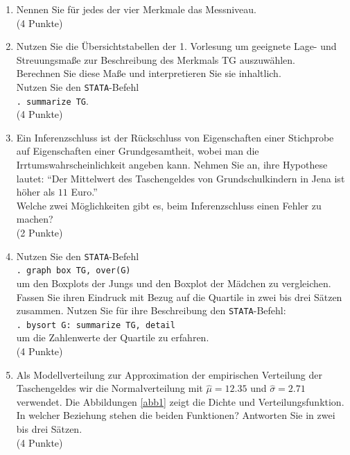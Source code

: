\documentclass[11pt]{article}
\newcommand{\punkte}[1]{{\small{ }(#1 Punkte)}}
\begin{document}
\begin{enumerate}
 \begin{enumerate}
 \item{Nennen Sie für jedes der vier Merkmale das Messniveau.}\\ \punkte{4}
 \item{Nutzen Sie die Übersichtstabellen der 1. Vorlesung um geeignete Lage- und Streuungsmaße
 zur Beschreibung des Merkmals TG auszuwählen.\\ Berechnen Sie diese Maße und interpretieren Sie sie inhaltlich.\\
 Nutzen Sie den \texttt{STATA}-Befehl \\ \texttt{. summarize TG}.}\\ \punkte{4}
 \item{ Ein Inferenzschluss ist der Rückschluss von Eigenschaften einer Stichprobe auf Eigenschaften einer Grundgesamtheit, wobei man die Irrtumswahrscheinlichkeit angeben kann. Nehmen Sie an, ihre Hypothese lautet: ``Der Mittelwert des Taschengeldes von Grundschulkindern in Jena ist höher als $11$ Euro.''\\ Welche
 zwei Möglichkeiten gibt es, beim Inferenzschluss einen Fehler zu machen?}\\ \punkte{2}
 \item{Nutzen Sie den \texttt{STATA}-Befehl \\ \texttt{. graph box TG, over(G)}\\ um den Boxplots
 der Jungs und den Boxplot der Mädchen zu vergleichen. \\Fassen Sie ihren Eindruck mit Bezug
 auf die Quartile in zwei bis drei Sätzen zusammen.
 Nutzen Sie für ihre Beschreibung den \texttt{STATA}-Befehl: \\ \texttt{. bysort G: summarize TG, detail}\\ um die Zahlenwerte
 der Quartile zu erfahren.}\\ \punkte{4}
 \item{Als Modellverteilung zur Approximation der empirischen Verteilung der Taschengeldes
 wir die Normalverteilung mit $\hat{\mu}=12.35$ und $\hat{\sigma}=2.71$ verwendet.
 Die Abbildungen \ref{abb1}  zeigt die Dichte und Verteilungsfunktion. In welcher Beziehung 
 stehen die beiden Funktionen? Antworten Sie in zwei bis drei Sätzen.}\\ \punkte{4}
  \begin{figure}[ht]
 	\centering

\end{figure}
\end{enumerate}
\end{enumerate}
\end{document}
